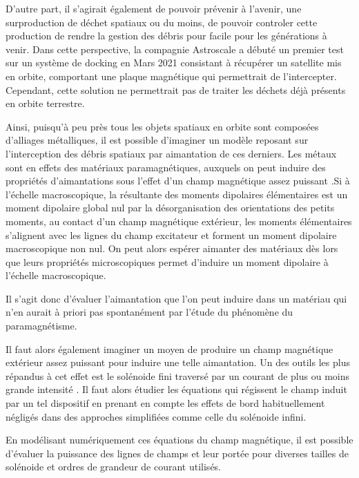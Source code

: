 \documentclass[a4paper,1pt]{article}
\begin{document}
D'autre part, il s'agirait également de pouvoir prévenir à l'avenir, une surproduction de déchet spatiaux ou du moins, de pouvoir controler cette production de rendre la gestion des débris pour facile pour les générations à venir. Dans cette perspective, la compagnie Astroscale a débuté un premier test sur un système de docking en Mars 2021 \cite{Astroscale} consistant à récupérer un satellite mis en orbite, comportant une plaque magnétique qui permettrait de l'intercepter. Cependant, cette solution ne permettrait pas de traiter les déchets déjà présents en orbite terrestre.

Ainsi, puisqu'à peu près tous les objets spatiaux en orbite sont composées d'alliages métalliques, il est possible d'imaginer un modèle reposant sur l'interception des débris spatiaux par aimantation de ces derniers. Les métaux sont en effets des matériaux paramagnétiques, auxquels on peut induire des propriétés d'aimantations sous l'effet d'un champ magnétique assez puissant \cite{MatMagnetiques}.Si à l'échelle macroscopique, la résultante des moments dipolaires élémentaires est un moment dipolaire global nul par la désorganisation des orientations des petits moments, au contact d'un champ magnétique extérieur, les moments élémentaires s'alignent avec les lignes du champ excitateur et forment un moment dipolaire macroscopique non nul. On peut alors espérer aimanter des matériaux dès lors que leurs propriétés microscopiques permet d'induire un moment dipolaire à l'échelle macroscopique.

Il s'agit donc d'évaluer l'aimantation que l'on peut induire dans un matériau qui n'en aurait à priori pas spontanément par l'étude du phénomène du paramagnétisme.

Il faut alors également imaginer un moyen de produire un champ magnétique extérieur assez puissant pour induire une telle aimantation. Un des outils les plus répandus à cet effet est le solénoide fini traversé par un courant de plus ou moins grande intensité \cite{Solenoide}. Il faut alors étudier les équations qui régissent le champ induit par un tel dispositif en prenant en compte les effets de bord habituellement négligés dans des approches simplifiées comme celle du solénoide infini. 

En modélisant numériquement ces équations du champ magnétique, il est possible d'évaluer la puissance des lignes de champs et leur portée pour diverses tailles de solénoide et ordres de grandeur de courant utilisés.
\end{document}

